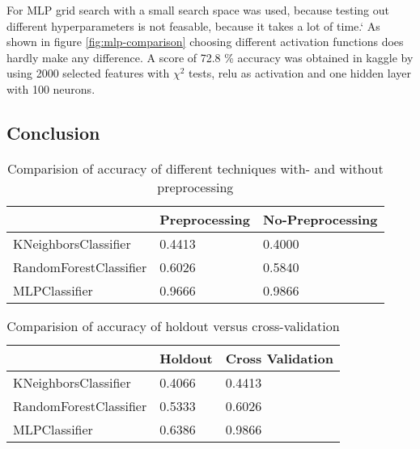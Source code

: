 For MLP grid search with a small search space was used, because testing out different hyperparameters is not feasable, because it takes a lot of time.`
As shown in figure \ref{fig:mlp-comparison} choosing different activation functions does hardly make any difference.
A score of 72.8 \% accuracy was obtained in kaggle by using 2000 selected features with ${\chi}^2$ tests, relu as activation and one hidden layer with 100 neurons.



\subsection{Conclusion}



\begin{table}[H]
\begin{center}
\begin{tabular}{|l|l|l|}
\hline
                       & Preprocessing & No-Preprocessing \\ \hline
KNeighborsClassifier   & 0.4413        & 0.4000           \\ \hline
RandomForestClassifier & 0.6026        & 0.5840           \\ \hline
MLPClassifier          & 0.9666        & 0.9866           \\ \hline
\end{tabular}
\caption{Comparision of accuracy of different techniques with- and without preprocessing}
\end{center}
\end{table}

\begin{table}[H]
\begin{center}
\begin{tabular}{|l|l|l|}
\hline
                       & Holdout & Cross Validation \\ \hline
KNeighborsClassifier   & 0.4066  & 0.4413           \\ \hline
RandomForestClassifier & 0.5333  & 0.6026           \\ \hline
MLPClassifier          & 0.6386  & 0.9866           \\ \hline
\end{tabular}
\caption{Comparision of accuracy of holdout versus cross-validation}
\end{center}
\end{table}

